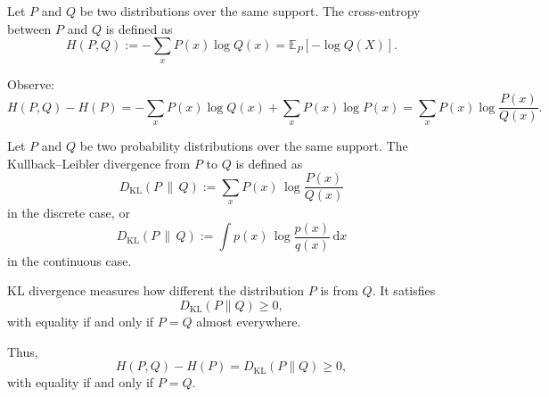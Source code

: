 \documentclass[../main]{subfiles}
\begin{document}
\begin{definition}
Let $P$ and $Q$ be two distributions over the same support.
The cross-entropy between $P$ and $Q$ is defined as
\begin{equation}
    H(P,Q)
    := -\sum_x P(x)\log Q(x)
    = \mathbb{E}_{P}[-\log Q(X)].
\end{equation}
\end{definition}

Observe:
\begin{equation}
    H(P,Q) - H(P)
    = -\sum_x P(x)\log Q(x)
      +\sum_x P(x)\log P(x)
    = \sum_x P(x)\log\frac{P(x)}{Q(x)}.
\end{equation}
\begin{definition}
    Let $P$ and $Q$ be two probability distributions over the same support.
    The Kullback--Leibler divergence from $P$ to $Q$ is defined as
    \begin{equation}
        D_{\mathrm{KL}}(P \,\|\, Q)
        := \sum_{x} P(x)\,\log\frac{P(x)}{Q(x)}
    \end{equation}
    in the discrete case, or
    \begin{equation}
        D_{\mathrm{KL}}(P \,\|\, Q)
        := \int p(x)\,\log\frac{p(x)}{q(x)}\,\mathrm{d}x
    \end{equation}
    in the continuous case.
    
    KL divergence measures how different the distribution $P$ is from $Q$.  
    It satisfies
    \begin{equation}
        D_{\mathrm{KL}}(P\|Q) \ge 0,
    \end{equation}
    with equality if and only if $P = Q$ almost everywhere.
    \end{definition}
Thus,
\begin{equation}
    H(P,Q) - H(P)
    = D_{\mathrm{KL}}(P\|Q) \ge 0,
\end{equation}
with equality if and only if $P = Q$.
\end{document}
